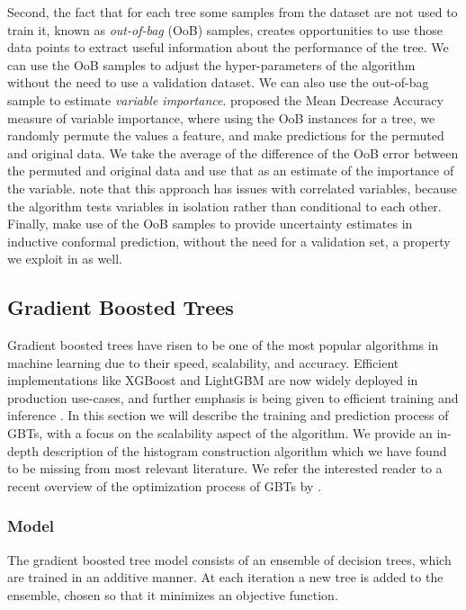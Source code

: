Second, the fact that for each tree some samples from the dataset are not
used to train it, known as \emph{out-of-bag} (OoB) samples, creates opportunities
to use those data points to extract useful information about the performance
of the tree. We can use the OoB samples to adjust the hyper-parameters of the
algorithm without the need to use a validation dataset. We can also use
the out-of-bag sample to estimate \emph{variable importance}.
\citet{random-forests} proposed the Mean Decrease Accuracy measure of
variable importance, where using the OoB instances for a tree, we
randomly permute the values a feature, and make predictions
for the permuted and original data. We take the average
of the difference of the OoB error between the permuted
and original data and use that as an estimate of the importance
of the variable. \citet{random-forest-survey} note that this approach has issues with correlated variables, because the
algorithm tests variables in isolation rather than conditional
to each other.
Finally, \citet{johansson2013conformal} make use of the OoB samples to provide
uncertainty estimates in inductive conformal prediction, without the need for a
validation set, a property we exploit in \uncertaintrees as well.

\subsection{Gradient Boosted Trees}
\label{sec:bg-dt-gbts}

Gradient boosted trees have risen to be one of the most popular algorithms
in machine learning due to their speed, scalability, and accuracy. Efficient
implementations like XGBoost \cite{xgboost} and LightGBM \cite{lightgbm}
are now widely deployed in production use-cases, and further emphasis
is being given to efficient training \cite{dimboost} and inference \cite{quickscorer}.
In this section we will describe the training and prediction process of GBTs,
with a focus on the scalability aspect of the algorithm. We provide an in-depth
description of the histogram construction algorithm which we have found to be missing
from most relevant literature. We refer the interested reader to a recent overview
of the optimization process of GBTs by \citet{biau-optimization}.

\subsubsection*{Model}

The gradient boosted tree model consists of an ensemble of decision trees,
which are trained in an additive manner. At each iteration a new tree is added
to the ensemble, chosen so that it minimizes an objective function.

